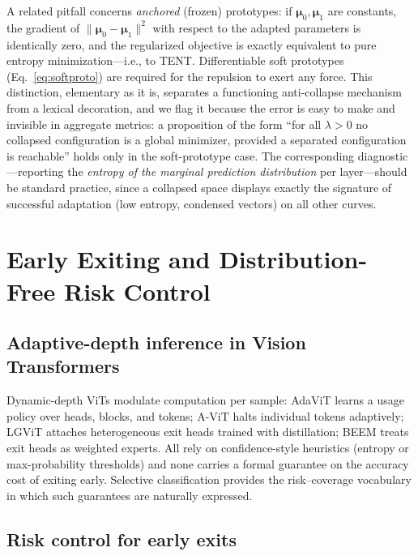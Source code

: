 \documentclass[preprint,12pt]{elsarticle}
\newcommand{\bmu}{\boldsymbol{\mu}}
\begin{document}
A related pitfall concerns \emph{anchored} (frozen) prototypes: if $\bmu_0, \bmu_1$ are constants, the gradient of $\lVert \bmu_0 - \bmu_1\rVert^2$ with respect to the adapted parameters is identically zero, and the regularized objective is exactly equivalent to pure entropy minimization---i.e., to TENT. Differentiable soft prototypes (Eq.~\ref{eq:softproto}) are required for the repulsion to exert any force. This distinction, elementary as it is, separates a functioning anti-collapse mechanism from a lexical decoration, and we flag it because the error is easy to make and invisible in aggregate metrics: a proposition of the form ``for all $\lambda > 0$ no collapsed configuration is a global minimizer, provided a separated configuration is reachable'' holds only in the soft-prototype case. The corresponding diagnostic---reporting the \emph{entropy of the marginal prediction distribution} per layer---should be standard practice, since a collapsed space displays exactly the signature of successful adaptation (low entropy, condensed vectors) on all other curves.

\section{Early Exiting and Distribution-Free Risk Control}
\label{sec:riskcontrol}

\subsection{Adaptive-depth inference in Vision Transformers}

Dynamic-depth ViTs modulate computation per sample: AdaViT \citep{meng2022adavit} learns a usage policy over heads, blocks, and tokens; A-ViT \citep{yin2022avit} halts individual tokens adaptively; LGViT \citep{xu2023lgvit} attaches heterogeneous exit heads trained with distillation; BEEM \citep{bajpai2025beem} treats exit heads as weighted experts. All rely on confidence-style heuristics (entropy or max-probability thresholds) and none carries a formal guarantee on the accuracy cost of exiting early. Selective classification \citep{geifman2017selective} provides the risk--coverage vocabulary in which such guarantees are naturally expressed.

\subsection{Risk control for early exits}
\end{document}

